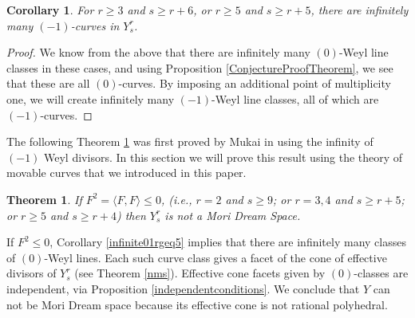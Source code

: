 \documentclass[12pt]{article}
\newtheorem{theorem}[equation]{Theorem}
\newtheorem{corollary}[equation]{Corollary}
\numberwithin{equation}{section}
\numberwithin{subeq}{equation}
\begin{document}

\begin{corollary}\label{infinite-1curves}
For $r \geq 3$ and $s \geq r+6$, or $r \geq 5$ and $s \geq r+5$,
there are infinitely many $(-1)$-curves in $Y^r_s$.
\end{corollary}

\begin{proof}
We know from the above that there are infinitely many $(0)$-Weyl line classes in these cases,
and using Proposition \ref{ConjectureProofTheorem}, 
we see that these are all $(0)$-curves.
By imposing an additional point of multiplicity one, 
we will create infinitely many $(-1)$-Weyl line classes, 
all of which are $(-1)$-curves.
\end{proof}


The following Theorem \ref{nms1} was first proved by Mukai in \cite{Mu05} 
using the infinity of $(-1)$ Weyl divisors. 
In this section we will prove this result using the theory of movable curves that we introduced in this paper.


\begin{theorem}\label{nms1}
If $F^2=\langle F, F \rangle \leq 0$,
(i.e., $r=2$ and $s\geq 9$; or $r=3, 4$ and $s\geq r+5$; or $r\geq 5$ and $s\geq r+4$)
then $Y^r_s$ is not a Mori Dream Space.
\end{theorem}

\medskip{}
If $F^2 \leq 0$, Corollary \ref{infinite01rgeq5} implies that
there are infinitely many classes of $(0)$-Weyl lines.
Each such curve class gives a facet of the cone of effective divisors of $Y^r_s$
(see Theorem \ref{nms}). Effective cone facets given by $(0)$-classes are independent, via Proposition \ref{independentconditions}.
We conclude that $Y$ can not be Mori Dream space
because its effective cone is not rational polyhedral.

\end{document}
